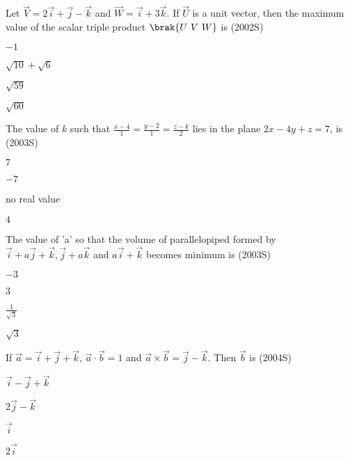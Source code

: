 \item Let $\vec{V}= 2\vec{i}+\vec{j}-\vec{k}$ and $\vec{W}= \vec{i}+3\vec{k}$. If $\vec{U}$ is a unit vector, then the maximum value of the scalar triple product $\brak{U \ V \ W}$ is 
\hfill (2002S)
\begin{enumerate}
\begin{multicols}{2}
    \item $-1$
    \item $\sqrt{10}+\sqrt{6}$
    \item $\sqrt{59}$
    \item $\sqrt{60}$
\end{multicols}
\end{enumerate}
\item The value of $k$ such that $\frac{x-4}{1}=\frac{y-2}{1}=\frac{z-k}{2}$ lies in the plane $2x-4y+z=7$, is
\hfill (2003S)
\begin{enumerate}
\begin{multicols}{2}
    \item $7$
    \item $-7$
    \item no real value
    \item $4$
\end{multicols}
\end{enumerate}
\item The value of 'a' so that the volume of parallelopiped formed by $\vec{i}+a\vec{j}+\vec{k},\vec{j}+a\vec{k}$ and $a\vec{i}+\vec{k}$ becomes minimum is 
\hfill (2003S)
\begin{enumerate}
\begin{multicols}{4}
    \item $-3$
    \item $3$
    \item $\frac{1}{\sqrt{3}}$
    \item $\sqrt{3}$
\end{multicols}
\end{enumerate}
\item If $\vec{a}=\vec{i}+\vec{j}+\vec{k}$, $\vec{a} \cdot \vec{b}=1$ and $\vec{a} \times \vec{b} = \vec{j} - \vec{k}$. Then $\vec{b}$ is 
\hfill (2004S)
\begin{enumerate}
\begin{multicols}{2}
    \item $\vec{i}-\vec{j}+\vec{k}$
    \item $2\vec{j}-\vec{k}$
    \item $\vec{i}$
    \item $2\vec{i}$
\end{multicols}
\end{enumerate}
